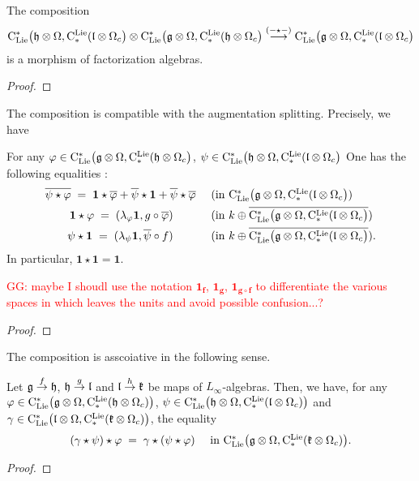 \documentclass[11pt]{amsart}
\numberwithin{equation}{section}
\def\greg{\textcolor{red}{GG: }\textcolor{red}}
\begin{document}
\begin{lmm}\label{L:compisfacmap} The composition $${\rm C}_{\rm Lie}^*\big(\mathfrak h \otimes \Omega, {\rm C}^{\rm Lie}_*(\mathfrak l \otimes \Omega_c  \big) \otimes 
{\rm C}_{\rm Lie}^*\big(\mathfrak g \otimes \Omega, {\rm C}^{\rm Lie}_*(\mathfrak h \otimes \Omega_c  \big)
\stackrel{(-\star-)}\longrightarrow 
{\rm C}_{\rm Lie}^*\big(\mathfrak g \otimes \Omega, {\rm C}^{\rm Lie}_*(\mathfrak l \otimes \Omega_c  \big)
$$
 is a morphism of factorization algebras.
\end{lmm}
\begin{proof}
 
\end{proof}
The composition is compatible with the augmentation splitting. Precisely, we have
\begin{lmm}\label{L:compisaugmented} For any $\varphi \in {\rm C}_{\rm Lie}^*\big(\mathfrak g \otimes \Omega, {\rm C}^{\rm Lie}_*(\mathfrak h \otimes \Omega_c  \big)$,
$\psi \in {\rm C}_{\rm Lie}^*\big(\mathfrak h \otimes \Omega, {\rm C}^{\rm Lie}_*(\mathfrak l \otimes \Omega_c  \big)$
 One has the following equalities  :
 \begin{align}
  \overline{\psi\star \varphi} \;= \;\mathbf{1}\star \overline{\varphi} +\overline{\psi}\star \mathbf{1} +\overline{\psi}\star \overline{\varphi} 
  & \quad\mbox{ (in  ${\rm C}_{\rm Lie}^*\big(\mathfrak g \otimes \Omega, {\rm C}^{\rm Lie}_*(\mathfrak l \otimes \Omega_c  \big) $)}\\
 \mathbf{1}\star \varphi \;=\;  (\lambda_\varphi \mathbf{1}, g\circ \overline{\varphi})\qquad
  &\quad\mbox{ (in  $k  \oplus \overline{{\rm C}_{\rm Lie}^*\big(\mathfrak g \otimes \Omega, {\rm C}^{\rm Lie}_*(\mathfrak l \otimes \Omega_c  \big)}$)}\\
  \psi \star \mathbf{1}\;=\; (\lambda_\psi \mathbf{1}, \overline{\psi} \circ f) \qquad
  &\quad\mbox{ (in  $k  \oplus \overline{{\rm C}_{\rm Lie}^*\big(\mathfrak g \otimes \Omega, {\rm C}^{\rm Lie}_*(\mathfrak l \otimes \Omega_c  \big)}$).}
 \end{align}
 In particular, $\mathbf{1} \star \mathbf{1} =\mathbf{1}$.
\end{lmm}
\greg{maybe I shoudl use the notation $\mathbf{1}_{\mathbf{f}}$, $\mathbf{1}_{\mathbf{g}}$, $\mathbf{1}_{\mathbf{g\circ f}}$ to differentiate 
the various spaces in which leaves the units and avoid possible confusion...?}
\begin{proof}
 
\end{proof}
The composition is asscoiative in the following sense.
\begin{lmm}\label{L:compisassociative} Let $\mathfrak g \stackrel{f}\to \mathfrak h$, $\mathfrak h \stackrel{g}\to \mathfrak l$ and $\mathfrak l \stackrel{h}\to \mathfrak{k}$ be maps of $L_\infty$-algebras.
 Then, we have, for any $\varphi \in {\rm C}_{\rm Lie}^*\big(\mathfrak g\otimes \Omega, {\rm C}^{\rm Lie}_*(\mathfrak h \otimes \Omega_c) \big)$, 
  $\psi \in {\rm C}_{\rm Lie}^*\big(\mathfrak h\otimes \Omega, {\rm C}^{\rm Lie}_*(\mathfrak l \otimes \Omega_c) \big)$ and  
  $\gamma \in {\rm C}_{\rm Lie}^*\big(\mathfrak l\otimes \Omega, {\rm C}^{\rm Lie}_*(\mathfrak{k} \otimes \Omega_c) \big)$, the equality 
  \[ (\gamma\star \psi)\star \varphi \;=\; \gamma\star (\psi \star \varphi) \quad \mbox{ in 
  ${\rm C}_{\rm Lie}^*\big(\mathfrak g\otimes \Omega, {\rm C}^{\rm Lie}_*(\mathfrak{k} \otimes \Omega_c) \big)$.}  \]
\end{lmm}
\begin{proof}
 
\end{proof}
\end{document}
